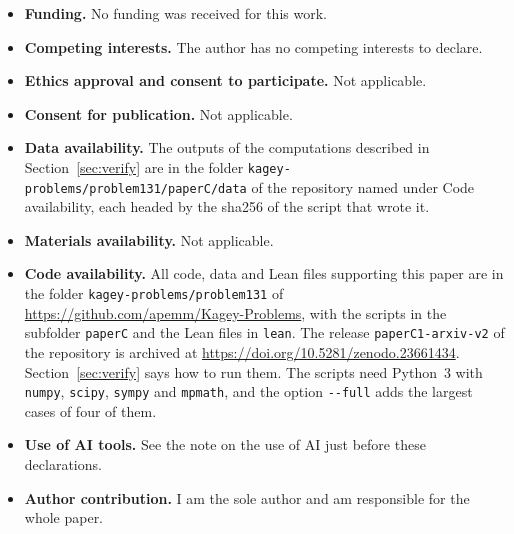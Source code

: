 \documentclass[pdflatex,sn-mathphys-num]{sn-jnl}%
\theoremstyle{thmstyleone}
\theoremstyle{thmstylethree}
\theoremstyle{thmstyletwo}
\begin{document}
\begin{itemize}
\item \textbf{Funding.} No funding was received for this work.
\item \textbf{Competing interests.} The author has no competing interests to declare.
\item \textbf{Ethics approval and consent to participate.} Not applicable.
\item \textbf{Consent for publication.} Not applicable.
\item \textbf{Data availability.} The outputs of the computations described in
Section~\ref{sec:verify} are in the folder
\nolinkurl{kagey-problems/problem131/paperC/data} of the repository named under
Code availability, each headed by the sha256 of the script that wrote it.
\item \textbf{Materials availability.} Not applicable.
\item \textbf{Code availability.} All code, data and Lean files supporting this
paper are in the folder \nolinkurl{kagey-problems/problem131} of
\url{https://github.com/apemm/Kagey-Problems}, with the scripts in the
subfolder \nolinkurl{paperC} and the Lean files in \nolinkurl{lean}. The release
\texttt{paperC1-arxiv-v2} of the repository is archived at
\url{https://doi.org/10.5281/zenodo.23661434}.
Section~\ref{sec:verify} says how to run them. The scripts need Python~3 with
\texttt{numpy}, \texttt{scipy}, \texttt{sympy} and \texttt{mpmath}, and the
option \texttt{-{}-full} adds the largest cases of four of them.
\item \textbf{Use of AI tools.} See the note on the use of AI just before these declarations.
\item \textbf{Author contribution.} I am the sole author and am responsible for the whole paper.
\end{itemize}

\begin{appendices}
\makeatletter{}\makeatother


\setcounter{section}{4}

\end{appendices}


\end{document}
